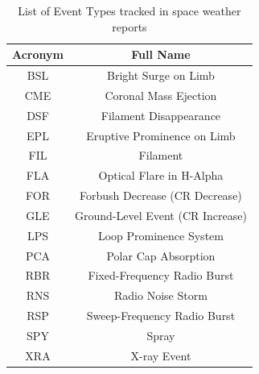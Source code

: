 \documentclass[12pt, letterpaper]{article}
\begin{document}
\begin{table}[h!]
	\begin{center}
		\begin{tabular}{||c | c ||} 
			\hline
			Acronym & Full Name \\ [0.5ex] 
			\hline\hline
			BSL & Bright Surge on Limb \\
			\hline
			CME & Coronal Mass Ejection \\ 
			\hline
			DSF & Filament Disappearance \\ 
			\hline
			EPL & Eruptive Prominence on Limb\\
			\hline
			FIL & Filament\\
			\hline
			FLA & Optical Flare in H-Alpha\\
			\hline
			FOR & Forbush Decrease (CR Decrease) \\
			\hline
			GLE & Ground-Level Event (CR Increase) \\
			\hline
			LPS & Loop Prominence System\\
			\hline
			PCA & Polar Cap Absorption\\
			\hline
			RBR & Fixed-Frequency Radio Burst\\
			\hline
			RNS & Radio Noise Storm\\
			\hline
			RSP & Sweep-Frequency Radio Burst\\
			\hline
			SPY & Spray\\
			\hline
			XRA & X-ray Event \\
			\hline
		\end{tabular}
		\caption{List of Event Types tracked in space weather reports}
		\label{space_weather_events}
	\end{center}
\end{table}
\end{document}
